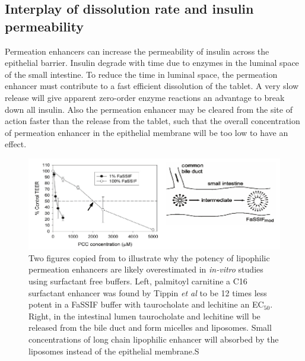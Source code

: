 \subsection{Interplay of dissolution rate and insulin permeability}
Permeation enhancers can increase the permeability of insulin across the epithelial barrier. Insulin degrade with time due to enzymes in the luminal space of the small intestine. To reduce the time in luminal space, the permeation enhancer must contribute to a fast efficient dissolution of the tablet. A very slow release will give apparent zero-order enzyme reactions an advantage to break down all insulin. Also the permeation enhancer may be cleared from the site of action faster than the release from the tablet, such that the overall concentration of permeation enhancer in the epithelial membrane will be too low to have an effect.

\begin{figure}[!htpb]
\includegraphics[width=\textwidth,height=\textheight,keepaspectratio]{graphics/develop_fassif.pdf}
\caption{Two figures copied from \cite{tippin2008biorelevant,nawroth2011liposome} to illustrate why the potency of lipophilic permeation enhancers are likely overestimated in \textit{in-vitro} studies using surfactant free buffers. Left, palmitoyl carnitine a C16 surfactant enhancer was found by Tippin \textit{et al} to be 12 times less potent in a FaSSIF buffer with taurocholate and lechitine an EC$_{50}$. Right, in the intestinal lumen taurocholate and lechitine will be released from the bile duct and form micelles and liposomes. Small concentrations of long chain lipophilic enhancer will absorbed by the liposomes instead of the epithelial membrane.S}
\label{devel_fassif}
\end{figure}

